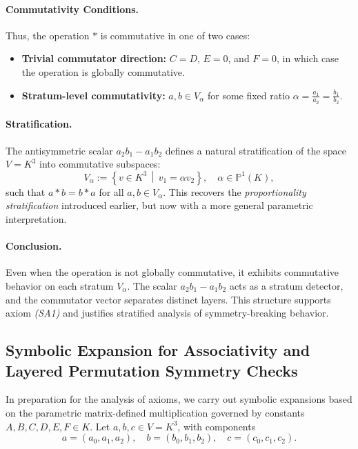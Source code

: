 \documentclass[12pt]{article}
\theoremstyle{definition}
\theoremstyle{plain}
\theoremstyle{remark}
\begin{document}
\paragraph{Commutativity Conditions.}
Thus, the operation \( * \) is commutative in one of two cases:
\begin{itemize}
  \item \textbf{Trivial commutator direction:} \( C = D \), \( E = 0 \), and \( F = 0 \), in which case the operation is globally commutative.
  \item \textbf{Stratum-level commutativity:} \( a, b \in V_\alpha \) for some fixed ratio \( \alpha = \frac{a_1}{a_2} = \frac{b_1}{b_2} \).
\end{itemize}

\paragraph{Stratification.}
The antisymmetric scalar \( a_2 b_1 - a_1 b_2 \) defines a natural stratification of the space \( V = K^3 \) into commutative subspaces:
\[
V_\alpha := \left\{ v \in K^3 \,\middle|\, v_1 = \alpha v_2 \right\}, \quad \alpha \in \mathbb{P}^1(K),
\]
such that \( a * b = b * a \) for all \( a, b \in V_\alpha \). This recovers the \emph{proportionality stratification} introduced earlier, but now with a more general parametric interpretation.

\paragraph{Conclusion.}
Even when the operation is not globally commutative, it exhibits commutative behavior on each stratum \( V_\alpha \). The scalar \( a_2 b_1 - a_1 b_2 \) acts as a stratum detector, and the commutator vector separates distinct layers. This structure supports axiom \emph{(SA1)} and justifies stratified analysis of symmetry-breaking behavior.

\subsection{Symbolic Expansion for Associativity and Layered Permutation Symmetry Checks}

In preparation for the analysis of axioms, we carry out symbolic expansions based on the parametric matrix-defined multiplication governed by constants \( A, B, C, D, E, F \in K \). Let \( a, b, c \in V = K^3 \), with components
\[
a = (a_0, a_1, a_2), \quad b = (b_0, b_1, b_2), \quad c = (c_0, c_1, c_2).
\]
\end{document}
